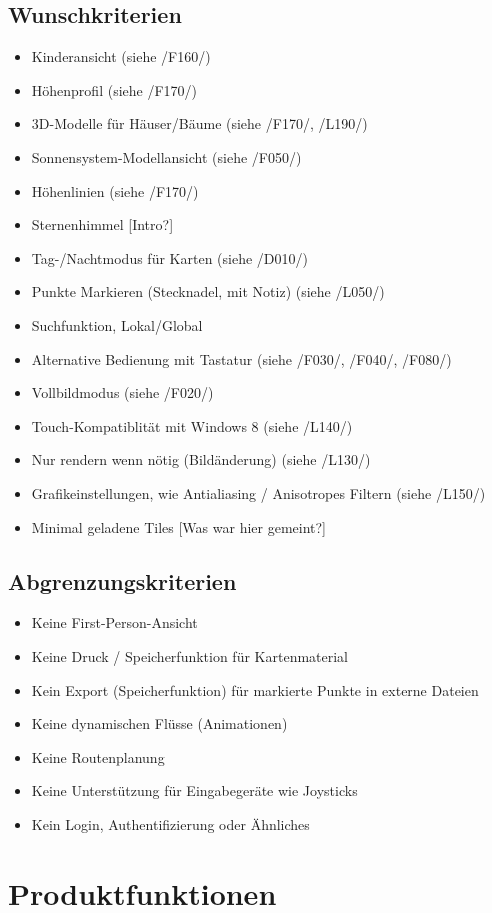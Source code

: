\documentclass[10pt]{scrreprt}
\begin{document}
\section{Wunschkriterien}
\begin{itemize}
\item Kinderansicht (siehe /F160/)
\item Höhenprofil (siehe /F170/)
\item 3D-Modelle für Häuser/Bäume (siehe /F170/, /L190/)
\item Sonnensystem-Modellansicht (siehe /F050/)
\item Höhenlinien (siehe /F170/)
\item Sternenhimmel [Intro?]
\item Tag-/Nachtmodus für Karten (siehe /D010/)
\item Punkte Markieren (Stecknadel, mit Notiz) (siehe /L050/)
\item Suchfunktion, Lokal/Global
\item Alternative Bedienung mit Tastatur (siehe /F030/, /F040/, /F080/)
\item Vollbildmodus (siehe /F020/)
\item Touch-Kompatiblität mit Windows 8 (siehe /L140/)
\item Nur rendern wenn nötig (Bildänderung) (siehe /L130/)
\item Grafikeinstellungen, wie Antialiasing / Anisotropes Filtern (siehe /L150/)
\item Minimal geladene Tiles [Was war hier gemeint?]
\end{itemize}
\section{Abgrenzungskriterien}
\begin{itemize}
\item Keine First-Person-Ansicht
\item Keine Druck / Speicherfunktion für Kartenmaterial
\item Kein Export (Speicherfunktion) für markierte Punkte in externe Dateien
\item Keine dynamischen Flüsse (Animationen)
\item Keine Routenplanung
\item Keine Unterstützung für Eingabegeräte wie Joysticks
\item Kein Login, Authentifizierung oder Ähnliches
\end{itemize}


\chapter{Produktfunktionen}
\end{document}
